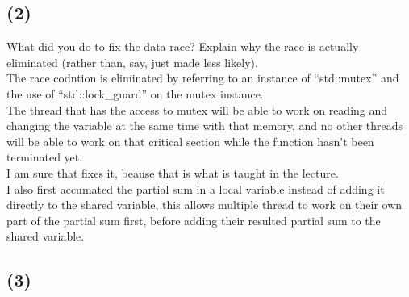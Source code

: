 \documentclass[]{article}
\begin{document}
    \subsection*{(2)}
        What did you do to fix the data race?  Explain why the race is actually eliminated (rather than, say, just made less likely).
        \\
        The race codntion is eliminated by referring to an instance of ``std::mutex'' and the use of ``std::lock\_guard'' on the mutex instance. 
        \\
        The thread that has the access to mutex will be able to work on reading and changing the variable at the same time with that memory, and no other threads will be able to work on that critical section while the function hasn't been terminated yet. 
        \\
        I am sure that fixes it, beause that is what is taught in the lecture. 
        \\
        I also first accumated the partial sum in a local variable instead of adding it directly to the shared variable, this allows multiple thread to work on their own part of the partial sum first, before adding their resulted partial sum to the shared variable. 
    \subsection*{(3)}
        
        
\end{document}
